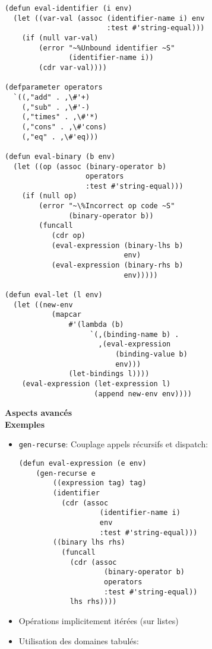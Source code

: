 \documentclass[11pt]{article}
\begin{document}
{\begin{verbatim}
(defun eval-identifier (i env) 
  (let ((var-val (assoc (identifier-name i) env 
                        :test #'string-equal))) 
    (if (null var-val) 
        (error "~%Unbound identifier ~S" 
               (identifier-name i)) 
        (cdr var-val))))

(defparameter operators 
  `((,"add" . ,\#'+) 
    (,"sub" . ,\#'-) 
    (,"times" . ,\#'*) 
    (,"cons" . ,\#'cons) 
    (,"eq" . ,\#'eq)))

(defun eval-binary (b env) 
  (let ((op (assoc (binary-operator b) 
                   operators 
                   :test #'string-equal))) 
    (if (null op) 
        (error "~\%Incorrect op code ~S" 
               (binary-operator b)) 
        (funcall 
           (cdr op) 
           (eval-expression (binary-lhs b) 
                            env) 
           (eval-expression (binary-rhs b) 
                            env)))))
 
(defun eval-let (l env) 
  (let ((new-env
           (mapcar 
               #'(lambda (b) 
                    `(,(binding-name b) . 
                      ,(eval-expression
                          (binding-value b) 
                          env))) 
               (let-bindings l)))) 
    (eval-expression (let-expression l) 
                     (append new-env env)))) 
\end{verbatim}

\newpage

\begin{center}
{\huge\bf Aspects avancés \\
      Exemples}
\end{center}

\vskip 2cm

\begin{itemize}
\item {\tt gen-recurse}: Couplage appels récursifs et dispatch:

\begin{verbatim}
(defun eval-expression (e env) 
    (gen-recurse e 
        ((expression tag) tag)
        (identifier 
          (cdr (assoc 
                   (identifier-name i) 
                   env 
                   :test #'string-equal)))
        ((binary lhs rhs) 
          (funcall 
            (cdr (assoc 
                    (binary-operator b) 
                    operators 
                    :test #'string-equal))
            lhs rhs))))
\end{verbatim}
\item Opérations implicitement itérées (sur listes)
\item Utilisation des domaines tabulés:
\end{itemize}

}
\end{document}
